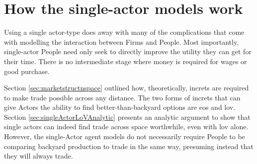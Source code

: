 
\section{How the single-actor models work \label{sec:singleactorFramework}}

Using a single actor-type does away with many of the complications that come with modelling the interaction between Firms and People. Most importantly, single-actor People need only seek to directly improve the utility they can get for their time. There is no intermediate stage where money is required for wages or good purchase.

Section \ref{sec:marketstructnspace} outlined how, theoretically, \gls{increts} are required to make trade possible across any distance. The two forms of \gls{increts} that can give Actors the ability to find better-than-backyard options are \gls{eos} and \gls{lov}. Section \ref{sec:singleActorLoVAnalytic} presents an analytic argument to show that single actors can indeed find trade across space worthwhile, even with \gls{lov} alone. However, the single-Actor agent models do not necessarily require People to be comparing backyard production to trade in the same way, presuming instead that they will always trade. 

